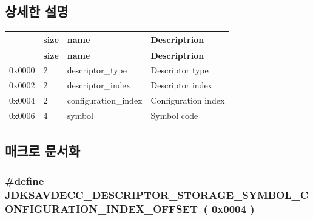 \subsection{상세한 설명}
\tabulinesep=1mm
\begin{longtabu} spread 0pt [c]{*4{|X[-1]}|}
\hline
{}&{\bf size }&{\bf name }&{\bf Descriptrion  }\\
\endfirsthead
\hline
\endfoot
\hline
{}&{\bf size }&{\bf name }&{\bf Descriptrion  }\\
\endhead
0x0000 &2 &descriptor\+\_\+type &Descriptor type \\
0x0002 &2 &descriptor\+\_\+index &Descriptor index \\
0x0004 &2 &configuration\+\_\+index &Configuration index \\
0x0006 &4 &symbol &Symbol code \\
\end{longtabu}


\subsection{매크로 문서화}
\subsubsection[{\texorpdfstring{J\+D\+K\+S\+A\+V\+D\+E\+C\+C\+\_\+\+D\+E\+S\+C\+R\+I\+P\+T\+O\+R\+\_\+\+S\+T\+O\+R\+A\+G\+E\+\_\+\+S\+Y\+M\+B\+O\+L\+\_\+\+C\+O\+N\+F\+I\+G\+U\+R\+A\+T\+I\+O\+N\+\_\+\+I\+N\+D\+E\+X\+\_\+\+O\+F\+F\+S\+ET}{JDKSAVDECC_DESCRIPTOR_STORAGE_SYMBOL_CONFIGURATION_INDEX_OFFSET}}]{\setlength{\rightskip}{0pt plus 5cm}\#define J\+D\+K\+S\+A\+V\+D\+E\+C\+C\+\_\+\+D\+E\+S\+C\+R\+I\+P\+T\+O\+R\+\_\+\+S\+T\+O\+R\+A\+G\+E\+\_\+\+S\+Y\+M\+B\+O\+L\+\_\+\+C\+O\+N\+F\+I\+G\+U\+R\+A\+T\+I\+O\+N\+\_\+\+I\+N\+D\+E\+X\+\_\+\+O\+F\+F\+S\+ET~( 0x0004 )}\hypertarget{group__descriptor__storage__symbol_ga7c33f72a7c2dd5e241efa9c638e810ed}{}\label{group__descriptor__storage__symbol_ga7c33f72a7c2dd5e241efa9c638e810ed}


